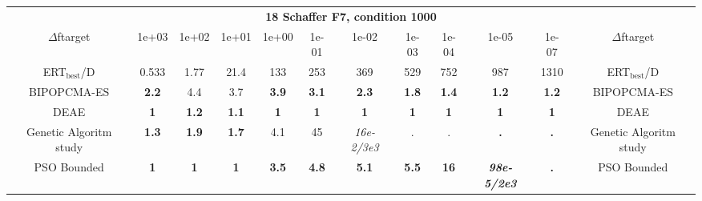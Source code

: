 \begin{tabular}{cccccccccccc}
 & \multicolumn{10}{c}{{\normalsize \textbf{18 Schaffer F7, condition 1000}}}\\
$\Delta$ftarget& 1e+03& 1e+02& 1e+01& 1e+00& 1e-01& 1e-02& 1e-03& 1e-04& 1e-05& 1e-07 & $\Delta$ftarget \\
ERT$_{\textrm{best}}$/D& 0.533& 1.77& 21.4& 133& 253& 369& 529& 752& 987& 1310 & ERT$_{\textrm{best}}$/D \\
\hline
BIPOPCMA-ES & \textbf{2.2} & 4.4 & 3.7 & \textbf{3.9} & \textbf{3.1} & \textbf{2.3} & \textbf{1.8} & \textbf{1.4} & \textbf{1.2} & \textbf{1.2} & BIPOPCMA-ES \cite{add_an_entry_for_BIPOPCMA-ES_in_bbob.bib}\\
DEAE & \textbf{1} & \textbf{1.2} & \textbf{1.1} & \textbf{1} & \textbf{1} & \textbf{1} & \textbf{1} & \textbf{1} & \textbf{1} & \textbf{1} & DEAE \cite{add_an_entry_for_DEAE_in_bbob.bib}\\
Genetic Algoritm study & \textbf{1.3} & \textbf{1.9} & \textbf{1.7} & 4.1 & 45 & \textit{16e-2}\textit{/3e3} & . & . & \textbf{.} & \textbf{.} & Genetic Algoritm study \cite{add_an_entry_for_Genetic Algoritm study_in_bbob.bib}\\
PSO Bounded & \textbf{1} & \textbf{1} & \textbf{1} & \textbf{3.5} & \textbf{4.8} & \textbf{5.1} & \textbf{5.5} & \textbf{16} & \textbf{\textit{98e-5}\textit{/2e3}} & \textbf{.} & PSO Bounded \cite{add_an_entry_for_PSO Bounded_in_bbob.bib}
\end{tabular}

